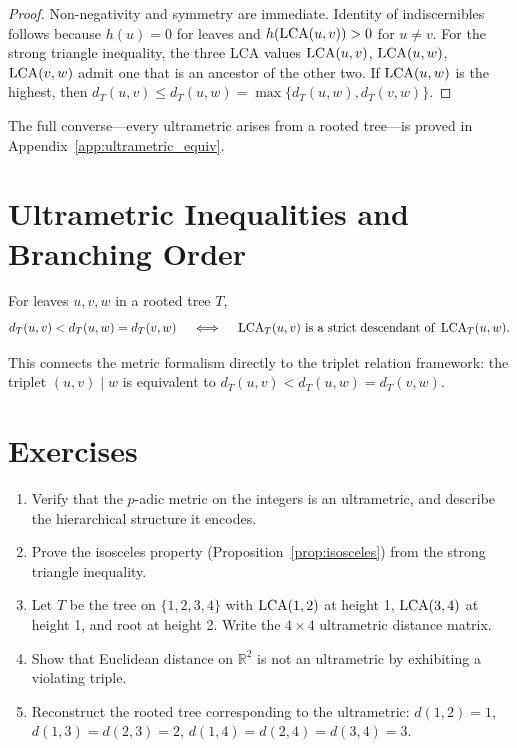 \begin{proof}
Non-negativity and symmetry are immediate. Identity of indiscernibles follows because $h(u)=0$ for leaves and $h(\operatorname{LCA}(u,v))>0$ for $u\neq v$. For the strong triangle inequality, the three LCA values $\operatorname{LCA}(u,v)$, $\operatorname{LCA}(u,w)$, $\operatorname{LCA}(v,w)$ admit one that is an ancestor of the other two. If $\operatorname{LCA}(u,w)$ is the highest, then $d_T(u,v) \leq d_T(u,w) = \max\{d_T(u,w), d_T(v,w)\}$.
\end{proof}

The full converse---every ultrametric arises from a rooted tree---is proved in Appendix~\ref{app:ultrametric_equiv}.

\section{Ultrametric Inequalities and Branching Order}

\begin{proposition}
\label{prop:ultrametric_lca}
For leaves $u, v, w$ in a rooted tree $T$,
\[
d_T(u,v) < d_T(u,w) = d_T(v,w)
\quad \iff \quad
\operatorname{LCA}_T(u,v) \text{ is a strict descendant of } \operatorname{LCA}_T(u,w).
\]
\end{proposition}

This connects the metric formalism directly to the triplet relation framework: the triplet $(u,v)\mid w$ is equivalent to $d_T(u,v) < d_T(u,w) = d_T(v,w)$.

\section{Exercises}

\begin{enumerate}
  \item Verify that the $p$-adic metric on the integers is an ultrametric, and describe the hierarchical structure it encodes.
  \item Prove the isosceles property (Proposition~\ref{prop:isosceles}) from the strong triangle inequality.
  \item Let $T$ be the tree on $\{1,2,3,4\}$ with $\operatorname{LCA}(1,2)$ at height 1, $\operatorname{LCA}(3,4)$ at height 1, and root at height 2. Write the $4\times 4$ ultrametric distance matrix.
  \item Show that Euclidean distance on $\mathbb{R}^2$ is not an ultrametric by exhibiting a violating triple.
  \item Reconstruct the rooted tree corresponding to the ultrametric: $d(1,2)=1$, $d(1,3)=d(2,3)=2$, $d(1,4)=d(2,4)=d(3,4)=3$.
\end{enumerate}
